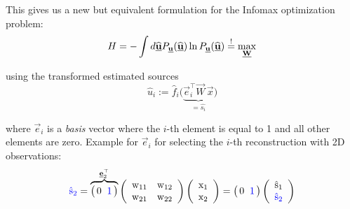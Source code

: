 \begin{frame}

This gives us a new but equivalent formulation for the Infomax optimization problem:
\begin{equation}\label{eq:infomax}
  H = -\int d \widehat{\vec{u}} P_{\vec{u}} (\widehat{\vec{u}})
  \ln P_{\vec{u}} (\widehat{\vec{u}}) \eqexcl \max_{\vec W} 
\end{equation}

using the transformed estimated sources
\begin{equation}
\widehat{u}_i := \widehat{f}_i \big( \underbrace{ \vec{e}_i^\top
		\vec{W} \, \vec{x}  }_{= \widehat{s_i} } \big) 
\end{equation}

where $\vec e_i$ is a \emph{basis} vector where the $i$-th element is equal to 1 and all other elements are zero.
Example for $\vec e_i$ for selecting the $i$-th reconstruction with 2D observations:
\begin{equation}
\textcolor{blue}{\hat {\mathrm{s}}_2} =
\overbrace{
\big( \, 0 \;\; \textcolor{blue}{1} \, \big) 
}^{\vec e_2^\top}
	\left( \begin{array}{ll}
	{\mathrm{w}_{11}} & {\mathrm{w}_{12}} \\
		{\mathrm{w}_{21}} & {\mathrm{w}_{22}} 
	\end{array} \right)
	\left( \begin{array}{ll}
		\mathrm{x}_1 \\ \mathrm{x}_2
	\end{array} \right)
	= \big( \, 0 \;\; \textcolor{blue}{1} \, \big)
	\left( \begin{array}{ll}
		\hat {\mathrm{s}}_1 \\ \textcolor{blue}{\hat {\mathrm{s}}_2}
	\end{array} \right)
\end{equation}

\end{frame}

